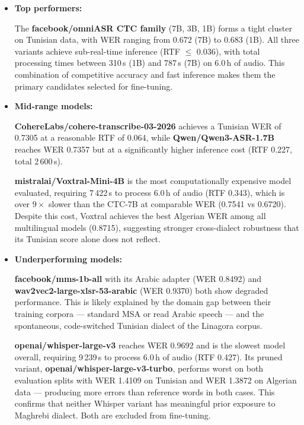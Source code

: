 \documentclass[12pt,a4paper]{report}
\begin{document}
\begin{itemize}

    \item \textbf{Top performers:}

    The \textbf{facebook/omniASR CTC family} (7B, 3B, 1B) forms a tight cluster on
    Tunisian data, with WER ranging from 0.672 (7B) to 0.683 (1B). All three variants
    achieve sub-real-time inference (RTF $\leq$ 0.036), with total processing times between
    310\,s (1B) and 787\,s (7B) on 6.0\,h of audio. This combination of competitive
    accuracy and fast inference makes them the primary candidates selected for fine-tuning.


    \item \textbf{Mid-range models:}

    \textbf{CohereLabs/cohere-transcribe-03-2026} achieves a Tunisian WER of 0.7305 at a
    reasonable RTF of 0.064, while \textbf{Qwen/Qwen3-ASR-1.7B} reaches WER 0.7357 but
    at a significantly higher inference cost (RTF 0.227, total 2\,600\,s).

    \textbf{mistralai/Voxtral-Mini-4B} is the most computationally expensive model
    evaluated, requiring 7\,422\,s to process 6.0\,h of audio (RTF 0.343), which is over
    $9\times$ slower than the CTC-7B at comparable WER (0.7541 vs 0.6720). \newline Despite this
    cost, Voxtral achieves the best Algerian WER among all multilingual models (0.8715),
    suggesting stronger cross-dialect robustness that its Tunisian score alone does not
    reflect.

    \item \textbf{Underperforming models:}

    \textbf{facebook/mms-1b-all} with its Arabic adapter (WER 0.8492) and
    \textbf{wav2vec2-large-xlsr-53-arabic} (WER 0.9370) both show degraded performance.
    This is likely explained by the domain gap between their training corpora --- standard
    MSA or read Arabic speech --- and the spontaneous, code-switched Tunisian dialect of
    the Linagora corpus.

    \textbf{openai/whisper-large-v3} reaches WER 0.9692 and is the slowest model
    overall, requiring 9\,239\,s to process 6.0\,h of audio (RTF 0.427). Its pruned
    variant, \textbf{openai/whisper-large-v3-turbo}, performs worst on both evaluation
    splits with WER 1.4109 on Tunisian and WER 1.3872 on Algerian data --- producing more
    errors than reference words in both cases. This confirms that neither Whisper variant
    has meaningful prior exposure to Maghrebi dialect. Both are excluded from fine-tuning.

\end{itemize}
\end{document}
